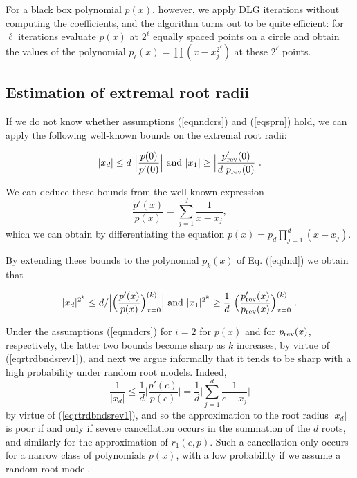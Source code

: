 \documentclass[runningheads]{llncs}
\begin{document}
%
For a black box polynomial $p(x)$, however, we apply DLG iterations without computing the coefficients, and the algorithm turns out to be quite efficient:
 for $\ell$ iterations  evaluate
 $p(x)$ at  $2^{\ell}$ equally spaced points on a circle and obtain
 the values of the polynomial $p_{\ell}(x)=\prod\left(x-x_j^{2^{\ell}}\right)$
 at these $2^{\ell}$ points.



\subsection{Estimation of extremal root radii}\label{sestextrrtrd}


If we do not know whether assumptions (\ref{eqnndcrs}) and (\ref{eqsprn}) hold, we can apply
 the following well-known bounds on the extremal root radii:

 \begin{equation}\label{eqrtrdbndsrev1} 
|x_d|\le d~\Big |\frac{p(0)}{p'(0)}\Big |~{\rm and}~|x_1|\ge \Big |\frac{p'_{\rm rev}(0)}{d~p_{\rm rev}(0)}\Big|.
\end{equation}

We can deduce these bounds 
from the well-known expression
\begin{equation}\label{eqratio}
\frac{p'(x)}{p(x)}=
\sum_{j=1}^d\frac{1}{x-x_j},
\end{equation} 
which we can obtain by differentiating the equation
$p(x)=p_d\prod_{j=1}^d(x-x_j)$.

By extending these bounds to
the polynomial $p_k(x)$ of Eq. (\ref{eqdnd}) we obtain that

 \begin{equation}\label{eqratio0} 
 |x_d|^{2^k}\le d/ 
\Big| \Big(\frac{p'(x)}{p(x)}\Big)_{x=0}^{(k)}\Big|~{\rm and}~|x_1|^{2^k}\ge \frac{1}{d}\Big| \Big(\frac{p'_{\rm rev}(x)}{p_{\rm rev}(x)}\Big)_{x=0}^{(k)}\Big|.
\end{equation}

Under the 
assumptions (\ref{eqnndcrs}) for $i=2$ for $p(x)$ and for $p_{\rm rev}(x)$, respectively,  the latter two bounds 
 become sharp as $k$ increases, by virtue of (\ref{eqrtrdbndsrev1}), and next we  argue informally that it tends to be sharp with a high probability under  random root models.
Indeed, 
\begin{equation}\label{eqratiorcp}
\frac{1}{|x_d|}\le \frac{1}{d}\Big|\frac{p'(c)}{p(c)}\Big|=\frac{1}{d}\Big|\sum_{j=1}^d \frac{1}{c-x_j}\Big|
\end{equation}  
by  virtue of 
(\ref{eqrtrdbndsrev1}), and so the
 approximation  
to the root radius $|x_d|$ is poor if and only if severe cancellation occurs in the summation of the $d$ roots, and similarly for the approximation
of  $r_1(c,p)$. Such a cancellation only occurs for a narrow class of polynomials $p(x)$, with a low  probability if we assume a random root model.
 
\end{document}
